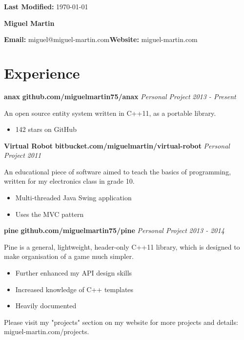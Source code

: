 \documentclass[10pt,oneside,a4paper]{article}
\newcommand{\project}[5] 
{
    {
    \textbf{#1} \hfill {\footnotesize\textbf{#2}}\newline
    \emph{#3} \hfill \emph{#4}
    }

    {
        \begin{description}[leftmargin=0.5cm, itemindent=0cm]
        \item {#5}
        \end{description}
    }
}
\newcommand{\info}[2] 
{
    {
        \section*{#1}
        \hrulefill\newline
    }

    {#2}
}
\begin{document}
{
    \raggedleft
    \footnotesize
    \textbf{Last Modified:} \today

    \centering
    {\huge\textbf{Miguel Martin}}

    \textbf{Email:} miguel@miguel-martin.com\hfill\textbf{Website:} miguel-martin.com\newline

}

\info{Experience}
{
    {
        \project{anax}{github.com/miguelmartin75/anax}
        {Personal Project}{2013 - Present}
        {
            An open source entity system written in C++11, as a portable library.
            \begin{itemize}
                \item 142 stars on GitHub
            \end{itemize}
        }
        \project{Virtual Robot}{bitbucket.com/miguelmartin/virtual-robot}
        {Personal Project}{2011}
        {
            An educational piece of software aimed to teach the basics of programming,
            written for my electronics class in grade 10.
            \begin{itemize}
                \item Multi-threaded Java Swing application
                \item Uses the MVC pattern
            \end{itemize}
        }
        \project{pine}{github.com/miguelmartin75/pine}
        {Personal Project}{2013 - 2014}
        {
            Pine is a general, lightweight, header-only C++11 library, which is designed to make organisation of a game much simpler. 
            \begin{itemize}
                \item Further enhanced my API design skills
                \item Increased knowledge of C++ templates
                \item Heavily documented
            \end{itemize}
        }
        Please visit my "projects" section on my website for more projects and details: miguel-martin.com/projects.
    }
}
\end{document}
